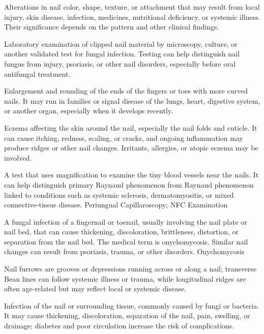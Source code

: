  Alterations in nail color, shape, texture, or attachment that may result from local injury, skin disease, infection,
medicines, nutritional deficiency, or systemic illness. Their significance depends on
the pattern and other clinical findings.

 Laboratory examination of clipped nail material by microscopy, culture, or another validated test for fungal infection. Testing can help distinguish nail fungus from injury, psoriasis, or other nail disorders, especially before oral antifungal treatment.

 Enlargement and rounding of the ends of the fingers or toes with more curved nails. It may run in families or signal disease of the lungs, heart, digestive system, or another organ, especially when it develops recently.

 Eczema affecting the skin around the nail,
  especially the nail folds and cuticle. It can cause itching, redness,
  scaling, or cracks, and ongoing inflammation may produce ridges or
  other nail changes. Irritants, allergies, or atopic eczema may be
  involved.

 A test that uses magnification to examine the tiny blood vessels near the nails. It can help distinguish primary Raynaud phenomenon from Raynaud phenomenon linked to conditions such as systemic sclerosis, dermatomyositis, or mixed connective-tissue disease.
\synonyms
Periungual Capillaroscopy; NFC Examination

 A fungal infection of a fingernail or toenail, usually involving the nail plate or nail bed, that can cause thickening, discoloration, brittleness, distortion, or separation from the nail bed. The medical term is onychomycosis. Similar nail changes can result from psoriasis, trauma, or other disorders.
\synonyms
Onychomycosis

 Nail furrows are grooves or depressions running across or along a nail; transverse Beau lines can follow systemic illness or trauma, while longitudinal ridges are often age-related but may reflect local or systemic disease.

 Infection of the nail or surrounding tissue, commonly caused by fungi or bacteria. It may cause thickening,
discoloration, separation of the nail, pain, swelling, or drainage; diabetes and poor circulation
increase the risk of complications.

